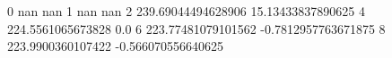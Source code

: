 0 nan nan
1 nan nan
2 239.69044494628906 15.13433837890625
4 224.5561065673828 0.0
6 223.77481079101562 -0.7812957763671875
8 223.9900360107422 -0.566070556640625
